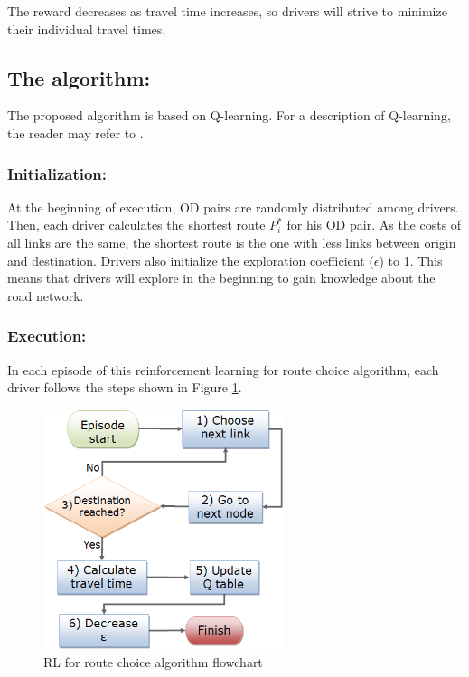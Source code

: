 \documentclass[12pt]{llncs}
\begin{document}
The reward decreases as travel time increases, so drivers will strive to minimize their individual travel times.

\subsection{The algorithm:}

The proposed algorithm is based on Q-learning. For a description of Q-learning, the reader may refer to \cite{Watkins&Dayan1992}.

\subsubsection{Initialization:}
At the beginning of execution, OD pairs are randomly distributed among drivers. Then, each driver calculates the shortest route $P_i^*$ for his OD pair. As the costs of all links are the same, the shortest route is the one with less links between origin and destination. Drivers also initialize the exploration coefficient ($\epsilon$) to 1. This means that drivers will explore in the beginning to gain knowledge about the road network.

\subsubsection{Execution:}

In each episode of this reinforcement learning for route choice algorithm, each driver follows the steps shown in Figure \ref{fig:flowchart}.

\begin{figure}[ht]
    \centerline{\includegraphics[width=7cm]{img/flowchart3.png}}
    \caption{RL for route choice algorithm flowchart}
    \label{fig:flowchart}
\end{figure}
\end{document}
